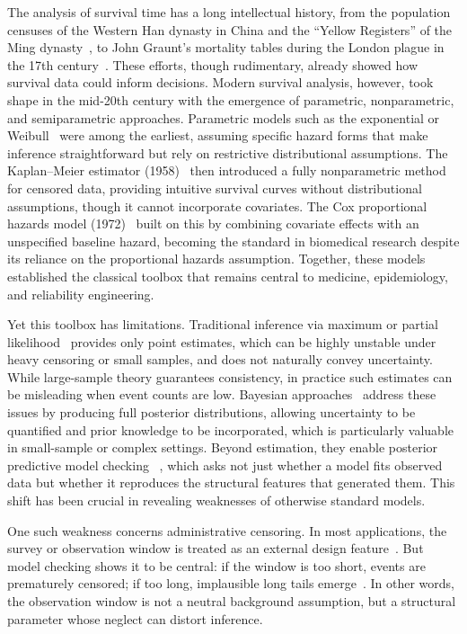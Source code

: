 The analysis of survival time has a long intellectual history, from the population censuses of the Western Han dynasty in China and the “Yellow Registers” of the Ming dynasty~\cite{von2012household}, to John Graunt’s mortality tables during the London plague in the 17th century~\cite{doi:10.1177/09677720221079826}. These efforts, though rudimentary, already showed how survival data could inform decisions. Modern survival analysis, however, took shape in the mid-20th century with the emergence of parametric, nonparametric, and semiparametric approaches. Parametric models such as the exponential or Weibull~\cite{ibrahim2013bayesian} were among the earliest, assuming specific hazard forms that make inference straightforward but rely on restrictive distributional assumptions. The Kaplan–Meier estimator (1958)~\cite{liu2012survival, kleinbaum1996survival} then introduced a fully nonparametric method for censored data, providing intuitive survival curves without distributional assumptions, though it cannot incorporate covariates. The Cox proportional hazards model (1972)~\cite{Efron01091977, liu2012survival} built on this by combining covariate effects with an unspecified baseline hazard, becoming the standard in biomedical research despite its reliance on the proportional hazards assumption. Together, these models established the classical toolbox that remains central to medicine, epidemiology, and reliability engineering.

Yet this toolbox has limitations. Traditional inference via maximum or partial likelihood~\cite{bartovs2022informed, kalbfleisch2002statistical} provides only point estimates, which can be highly unstable under heavy censoring or small samples, and does not naturally convey uncertainty. While large-sample theory guarantees consistency, in practice such estimates can be misleading when event counts are low. Bayesian approaches~\cite{gelman1995bayesian} address these issues by producing full posterior distributions, allowing uncertainty to be quantified and prior knowledge to be incorporated, which is particularly valuable in small-sample or complex settings. Beyond estimation, they enable posterior predictive model checking~\cite{gelman1995bayesian, https://doi.org/10.1002/ecm.1314}
, which asks not just whether a model fits observed data but whether it reproduces the structural features that generated them. This shift has been crucial in revealing weaknesses of otherwise standard models.

One such weakness concerns administrative censoring. In most applications, the survey or observation window is treated as an external design feature~\cite{barrajón2020effectrightcensoringbias, bartovs2022informed}. But model checking shows it to be central: if the window is too short, events are prematurely censored; if too long, implausible long tails emerge~\cite{barrajón2020effectrightcensoringbias}. In other words, the observation window is not a neutral background assumption, but a structural parameter whose neglect can distort inference.

